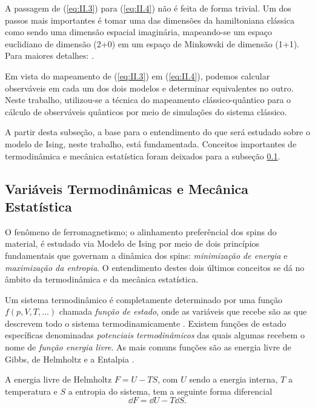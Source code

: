 A passagem de (\ref{eq:II.3}) para (\ref{eq:II.4}) não é feita de forma trivial. Um dos passos mais importantes é tomar uma das dimensões da hamiltoniana clássica como sendo uma dimensão espacial imaginária, mapeando-se um espaço euclidiano de dimensão (2+0) em um espaço de Minkowski de dimensão (1+1). Para maiores detalhes: \cite{KogutMain, FradSussk}. 

Em vista do mapeamento de (\ref{eq:II.3}) em (\ref{eq:II.4}), podemos calcular observáveis em cada um dos dois modelos e determinar equivalentes no outro. Neste trabalho, utilizou-se a técnica do mapeamento clássico-quântico para o cálculo de observáveis quânticos por meio de simulações do sistema clássico. 

A partir desta subseção, a base para o entendimento do que será estudado sobre o modelo de Ising, neste trabalho, está fundamentada. Conceitos importantes de termodinâmica e mecânica estatística foram deixados para a subseção \ref{subsec:VariaveisTermodinamicasEMecanicaEstatistica}.

\subsection{Variáveis Termodinâmicas e Mecânica Estatística}
\label{subsec:VariaveisTermodinamicasEMecanicaEstatistica}

O fenômeno de ferromagnetismo; o alinhamento preferêncial dos spins do material, é estudado via Modelo de Ising por meio de dois princípios fundamentais que governam a dinâmica dos spins: \textit{minimização de energia} e \textit{maximização da entropia}. O entendimento destes dois últimos conceitos se dá no âmbito da termodinâmica e da mecânica estatística.

Um sistema termodinâmico é completamente determinado por uma função $f(p, V, T, ...)$ chamada \textit{função de estado}, onde as variáveis que recebe são as que descrevem todo o sistema termodinamicamente \cite{Schroeder}. Existem funções de estado específicas denominadas \textit{potenciais termodinâmicos} das quais algumas recebem o nome de \textit{função energia livre}. As mais comuns funções são as energia livre de Gibbs, de Helmholtz e a Entalpia \cite{Huang, Schroeder}.

A energia livre de Helmholtz $F = U - TS$, com $U$ sendo a energia interna, $T$ a temperatura e $S$ a entropia do sistema, tem a seguinte forma diferencial
\begin{equation}
	\dd{F} = \dd{U} - T \dd{S}.
	\label{eq:II.5}
\end{equation}

